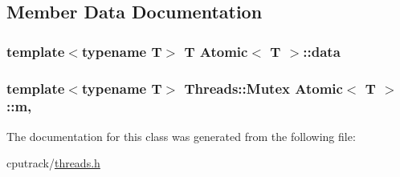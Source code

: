 \subsection{Member Data Documentation}
\subsubsection[{\texorpdfstring{data}{data}}]{\setlength{\rightskip}{0pt plus 5cm}template$<$typename T$>$ T {\bf Atomic}$<$ T $>$\+::data\hspace{0.3cm}{\ttfamily [private]}}\hypertarget{class_atomic_aeb248989b8f2d011dbd057dc66b82d8e}{}\label{class_atomic_aeb248989b8f2d011dbd057dc66b82d8e}
\subsubsection[{\texorpdfstring{m}{m}}]{\setlength{\rightskip}{0pt plus 5cm}template$<$typename T$>$ {\bf Threads\+::\+Mutex} {\bf Atomic}$<$ T $>$\+::m\hspace{0.3cm}{\ttfamily [mutable]}, {\ttfamily [private]}}\hypertarget{class_atomic_abae1e58efe0a8b71805ed84d8e8f155a}{}\label{class_atomic_abae1e58efe0a8b71805ed84d8e8f155a}


The documentation for this class was generated from the following file\+:\begin{DoxyCompactItemize}
\item 
cputrack/\hyperlink{threads_8h}{threads.\+h}\end{DoxyCompactItemize}
